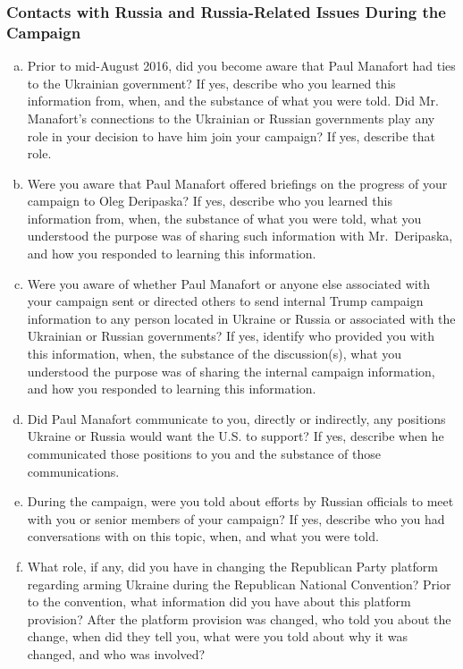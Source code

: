\subsubsection{Contacts with Russia and Russia-Related Issues During the Campaign}

\begin{enumerate}[a.]

\item Prior to mid-August 2016, did you become aware that Paul Manafort had ties to the Ukrainian government?
If yes, describe who you learned this information from, when, and the substance of what you were told.
Did Mr. Manafort’s connections to the Ukrainian or Russian governments play any role in your decision to have him join your campaign?
If yes, describe that role.

\item Were you aware that Paul Manafort offered briefings on the progress of your campaign to Oleg Deripaska?
If yes, describe who you learned this information from, when, the substance of what you were told, what you understood the purpose was of sharing such information with Mr.~Deripaska, and how you responded to learning this information.

\item Were you aware of whether Paul Manafort or anyone else associated with your campaign sent or directed others to send internal Trump campaign information to any person located in Ukraine or Russia or associated with the Ukrainian or Russian governments?
If yes, identify who provided you with this information, when, the substance of the discussion(s), what you understood the purpose was of sharing the internal campaign information, and how you responded to learning this information.

\item Did Paul Manafort communicate to you, directly or indirectly, any positions Ukraine or Russia would want the U.S. to support?
If yes, describe when he communicated those positions to you and the substance of those communications.

\item During the campaign, were you told about efforts by Russian officials to meet with you or senior members of your campaign?
If yes, describe who you had conversations with on this topic, when, and what you were told.

\item What role, if any, did you have in changing the Republican Party platform regarding arming Ukraine during the Republican National Convention?
Prior to the convention, what information did you have about this platform provision?
After the platform provision was changed, who told you about the change, when did they tell you, what were you told about why it was changed, and who was involved?


\end{enumerate}
